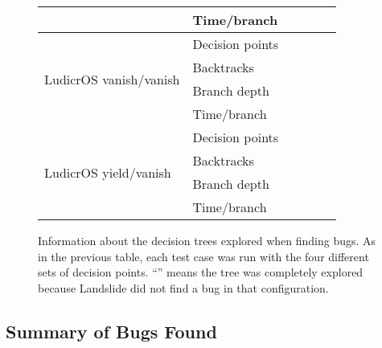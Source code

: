 \begin{figure*}[t!]
\begin{tabular}{|l|l||c|c|c|c|}
		& Time/branch  & & & & \\
		\hline
		\multirow{4}{*}{LudicrOS vanish/vanish} & Decision points & & & & \\
		& Backtracks   & & & & \\
		& Branch depth & & & & \\
		& Time/branch  & & & & \\
		\hline
		\multirow{4}{*}{LudicrOS yield/vanish} & Decision points & & & & \\
		& Backtracks   & & & & \\
		& Branch depth & & & & \\
		& Time/branch  & & & & \\
		\hline
	\end{tabular}
	\caption{Information about the decision trees explored when finding bugs. As in the previous table, each test case was run with the four different sets of decision points. ``'' means the tree was completely explored because Landslide did not find a bug in that configuration.}
	\label{fig:trees}
\end{figure*}

\subsection{Summary of Bugs Found}

